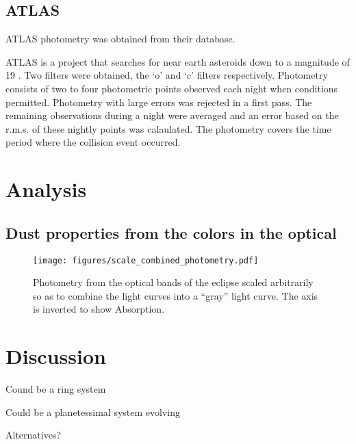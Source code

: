 \documentclass{aa}
\begin{document}
\subsection{ATLAS}

ATLAS photometry was obtained from their database.



ATLAS is a project that searches for near earth asteroids down to a magnitude of 19 
\citep{Tonry18}.
%
Two filters were obtained, the `o' and `c' filters respectively.
%
Photometry consists of two to four photometric points observed each night when conditions permitted.
%
Photometry with large errors was rejected in a first pass.
%
The remaining observations during a night were averaged and an error based on the r.m.s. of these nightly points was calaulated.
%
The photometry covers the time period where the collision event occurred. 


\section{Analysis}\label{sec:dustcloud}

\subsection{Dust properties from the colors in the optical}



\begin{figure*}
   \begin{centering}
   \texttt{[image: figures/scale\_combined\_photometry.pdf]}
      \caption{Photometry from the optical bands of the eclipse scaled arbitrarily so as to combine the light curves into a ``gray'' light curve.
      The axis is inverted to show Absorption.
              }
              \label{fig:allphot}
              \end{centering}
       \end{figure*}



\section{Discussion}\label{sec:discussion}

Cound be a ring system

Could be a planetessimal system evolving

Alternatives?
\end{document}

